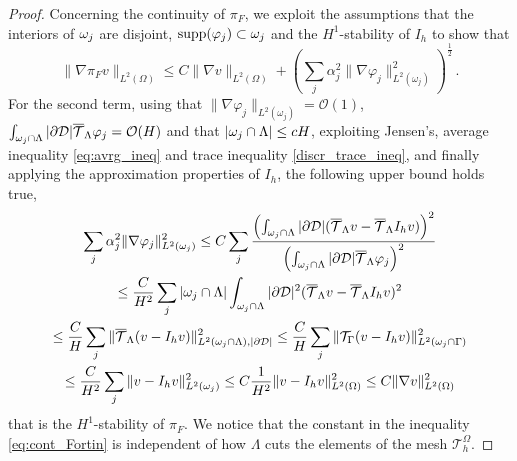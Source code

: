 \documentclass[r]{siamart171218}
\begin{document}
\begin{proof}
Concerning the continuity of $\pi_F$, we exploit the assumptions that the interiors of $\omega _j$ are disjoint, $\mathrm{supp}(\varphi _j) \subset \omega _j$ and the $H^1$-stability of $I_h$ to show that
\begin{equation*}
\|\nabla \pi_F v \|_{L^2(\Omega)} 
\leq C \|\nabla  v\|_{L^2(\Omega)} + \left(\sum_j\alpha_j^2\|\nabla \varphi _j\|^2_{L^2(\omega_j)}\right)^{\frac 12}\,.
\end{equation*}
For the second term,
using that $\|\nabla \varphi _j\|_{{L^2(\omega_j)}}=\mathcal{O}(1)$, 
$\int_{\omega _j\cap \Lambda}|\partial\mathcal{D}|{\overline{\mathcal{T}}_\Lambda} \varphi_j=\mathcal{O}(H)$ and that
$|\omega _j\cap \Lambda| \leq cH$,
exploiting Jensen's, average inequality \eqref{eq:avrg_ineq} 
and trace inequality \eqref{discr_trace_ineq},
and finally applying the approximation properties of $I_h$,
the following upper bound holds true,
\begin{multline*}
\sum_j \alpha_j ^2\|\nabla \varphi _j\|^2_{L^2(\omega_j)}
\leq C \sum_j \frac{\left(\int_{\omega _j\cap \Lambda} |\partial\mathcal{D}| ({\overline{\mathcal{T}}_\Lambda} v-{\overline{\mathcal{T}}_\Lambda} I_h v)\right)^2}{\left(\int_{\omega _j\cap \Lambda}|\partial\mathcal{D}|{\overline{\mathcal{T}}_\Lambda} \varphi_j \right)^2}
\\
\leq \frac {C}{H^2} \sum_j |\omega _j\cap \Lambda| \int_{\omega _j\cap \Lambda} |\partial\mathcal{D}|^2({\overline{\mathcal{T}}_\Lambda} v-{\overline{\mathcal{T}}_\Lambda} I_h v)^2
\\
\leq \frac {C}{H} \sum_j \| {\overline{\mathcal{T}}_\Lambda} (v-I_h v)\|^2_{L^2(\omega _j\cap \Lambda), |\partial\mathcal{D}|}
\leq \frac {C}{H} \sum_j \| {\mathcal{T}_\Gamma}(v-I_h v)\|^2_{L^2(\omega _j\cap \Gamma)}  
\\
\leq \frac {C}{H^2} \sum_j  \| v-I_h v\|^2_{L^2(\omega_j)} 
\leq C \frac {1}{H^2}  \| v-I_h v\|^2_{L^2(\Omega)} 
\leq C \|\nabla  v\|^2_{L^2(\Omega)}
\end{multline*}
that is the $H^1$-stability of $\pi_F$. We notice that the constant in the inequality \eqref{eq:cont_Fortin} is independent of how $\Lambda$  cuts the elements of the mesh $\mathcal{T}_h^{\Omega}$.
\end{proof}
\end{document}
